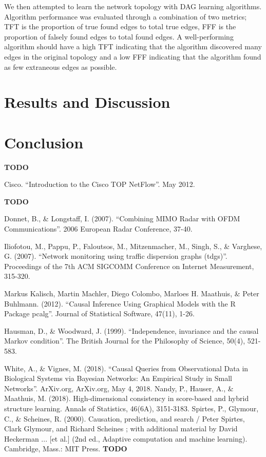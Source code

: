 \documentclass[conference]{IEEEtran}
\begin{document}
We then attempted to learn the network topology with DAG learning algorithms. Algorithm performance was evaluated through a combination of two metrics;  TFT is the proportion of true found edges to total true edges, FFF is the proportion of falsely found edges to total found edges. A well-performing algorithm should have a high TFT indicating that the algorithm discovered many edges in the original topology and a low FFF indicating that the algorithm found as few extraneous edges as possible.



\section{Results and Discussion}

\section{Conclusion}

\begin{thebibliography}{00}
 \textbf{TODO}

 Cisco. ``Introduction to the Cisco TOP NetFlow''. May 2012.

 \textbf{TODO}

 Donnet, B., \& Longstaff, I. (2007). ``Combining MIMO Radar with OFDM Communications''. 2006 European Radar Conference, 37-40.

 Iliofotou, M., Pappu, P., Faloutsos, M., Mitzenmacher, M., Singh, S., \& Varghese, G. (2007). ``Network monitoring using traffic dispersion graphs (tdgs)''. Proceedings of the 7th ACM SIGCOMM Conference on Internet Measurement, 315-320.

 Markus Kalisch, Martin Machler, Diego Colombo, Marloes H. Maathuis, \& Peter Buhlmann. (2012). ``Causal Inference Using Graphical Models with the R Package pcalg''. Journal of Statistical Software, 47(11), 1-26.

 Hausman, D., \& Woodward, J. (1999). ``Independence, invariance and the causal Markov condition''. The British Journal for the Philosophy of Science, 50(4), 521-583.

 White, A., \& Vignes, M. (2018). ``Causal Queries from Observational Data in Biological Systems via Bayesian Networks: An Empirical Study in Small Networks''. ArXiv.org, ArXiv.org, May 4, 2018.
 Nandy, P., Hauser, A., \& Maathuis, M. (2018). High-dimensional consistency in score-based and hybrid structure learning. Annals of Statistics, 46(6A), 3151-3183.
 Spirtes, P., Glymour, C., \& Scheines, R. (2000). Causation, prediction, and search / Peter Spirtes, Clark Glymour, and Richard Scheines ; with additional material by David Heckerman ... [et al.] (2nd ed., Adaptive computation and machine learning). Cambridge, Mass.: MIT Press.
 \textbf{TODO}

\end{thebibliography}
\end{document}
